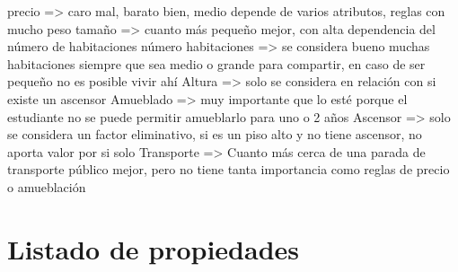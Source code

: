 \documentclass[12pt]{report} %
\begin{document}
    precio => caro mal, barato bien, medio depende de varios atributos, reglas con mucho peso
    tamaño => cuanto más pequeño mejor, con alta dependencia del número de habitaciones
    número habitaciones => se considera bueno muchas habitaciones siempre que sea medio o grande para compartir, en caso de ser pequeño no es posible vivir ahí
    Altura => solo se considera en relación con si existe un ascensor
    Amueblado => muy importante que lo esté porque el estudiante no se puede permitir amueblarlo para uno o 2 años
    Ascensor => solo se considera un factor eliminativo, si es un piso alto y no tiene ascensor, no aporta valor por si solo
    Transporte => Cuanto más cerca de una parada de transporte público mejor, pero no tiene tanta importancia como reglas de precio o amueblación

    \chapter{Listado de propiedades}
    \label{chap:propiedades}
\end{document}
